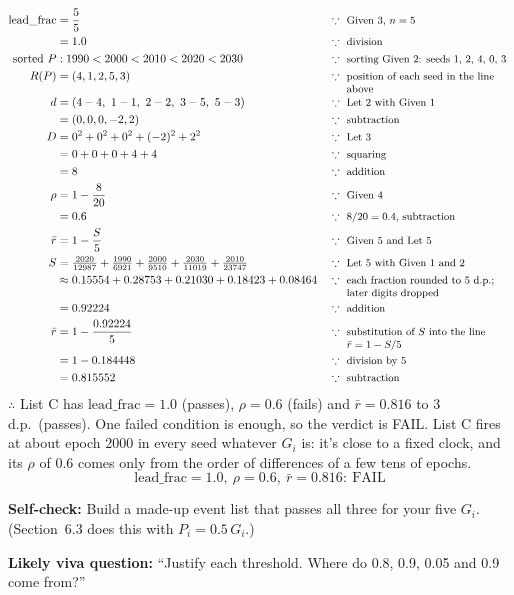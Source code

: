 \documentclass[11pt,a4paper,oneside,openany]{report}
\newcommand{\leadfrac}{\mathrm{lead\_frac}}
\newcommand{\rbar}{\bar{r}}
\newcommand{\why}[1]{\because\ \parbox[t]{5.0cm}{\raggedright\small #1}}
\newcommand{\fself}{\par\textbf{Self-check:} }
\newcommand{\fviva}{\par\textbf{Likely viva question:} }
\begin{document}
\begin{align*}
\leadfrac &= \frac{5}{5} && \why{Given 3, $n = 5$} \\
          &= 1.0 && \why{division} \\
\text{sorted } P &: 1990 < 2000 < 2010 < 2020 < 2030 && \why{sorting Given 2: seeds 1, 2, 4, 0, 3} \\
R(P) &= (4, 1, 2, 5, 3) && \why{position of each seed in the line above} \\
d &= (4-4,\ 1-1,\ 2-2,\ 3-5,\ 5-3) && \why{Let 2 with Given 1} \\
  &= (0, 0, 0, -2, 2) && \why{subtraction} \\
D &= 0^2 + 0^2 + 0^2 + (-2)^2 + 2^2 && \why{Let 3} \\
  &= 0 + 0 + 0 + 4 + 4 && \why{squaring} \\
  &= 8 && \why{addition} \\
\rho &= 1 - \frac{8}{20} && \why{Given 4} \\
     &= 0.6 && \why{$8/20 = 0.4$, subtraction} \\
\rbar &= 1 - \frac{S}{5} && \why{Given 5 and Let 5} \\
S &= \tfrac{2020}{12987} + \tfrac{1990}{6921} + \tfrac{2000}{9510} + \tfrac{2030}{11019} + \tfrac{2010}{23747} && \why{Let 5 with Given 1 and 2} \\
  &\approx 0.15554 + 0.28753 + 0.21030 + 0.18423 + 0.08464 && \why{each fraction rounded to 5 d.p.; later digits dropped} \\
  &= 0.92224 && \why{addition} \\
\rbar &= 1 - \frac{0.92224}{5} && \why{substitution of $S$ into the line $\rbar = 1 - S/5$} \\
      &= 1 - 0.184448 && \why{division by 5} \\
      &= 0.815552 && \why{subtraction}
\end{align*}
$\therefore$ List C has $\leadfrac = 1.0$ (passes), $\rho = 0.6$ (fails) and $\rbar = 0.816$ to 3 d.p.\ (passes). One failed condition is enough, so the verdict is FAIL. List C fires at about epoch 2000 in every seed whatever $G_i$ is: it's close to a fixed clock, and its $\rho$ of 0.6 comes only from the order of differences of a few tens of epochs.
\[\boxed{\leadfrac = 1.0, \ \rho = 0.6, \ \rbar = 0.816: \ \text{FAIL}}\]

\fself Build a made-up event list that passes all three for your five $G_i$. (Section~6.3 does this with $P_i = 0.5\,G_i$.)
\fviva ``Justify each threshold. Where do 0.8, 0.9, 0.05 and 0.9 come from?''
\end{document}
